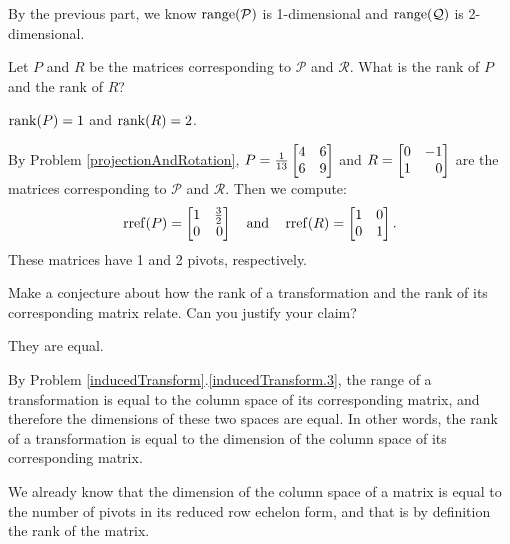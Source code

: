 \documentclass{workbook}
\begin{document}
\begin{slide}
\begin{parts}
\begin{solution}
				By the previous part, we know $\operatorname{range}(\mathcal P)$ is 1-dimensional
				and $\operatorname{range}(\mathcal Q)$ is 2-dimensional.
			\end{solution}
		\item Let $P$ and $R$ be the matrices corresponding to $\mathcal P$ and
			$\mathcal R$. What is the rank of $P$ and the rank of $R$?
			\begin{solution}
				$\operatorname{rank}(P)=1$ and $\operatorname{rank}(R)=2$.

				By Problem \ref{projectionAndRotation}, $P=\frac{1}{13}\mat{4&6\\6&9}$
				and $R=\mat{0&-1\\1&0}$ are the	matrices corresponding to
				$\mathcal P$ and $\mathcal R$. Then we compute:
				\[
					\rref(P)=\mat{1&\frac{3}{2}\\0&0}
					\quad \text{and} \quad
					\rref(R)=\mat{1&0\\0&1}.
				\]
				These matrices have 1 and 2 pivots, respectively.
			\end{solution}
		\item Make a conjecture about how the rank of a transformation and the
			rank of its corresponding matrix relate. Can you justify your claim?
			\label{rankOfMatricesAndTransformations.4}
			\begin{solution}
				They are equal.

				By Problem \ref{inducedTransform}.\ref{inducedTransform.3}, the
				range of a transformation is equal to the column space of its
				corresponding matrix, and therefore the dimensions of these two
				spaces are equal. In other words, the rank of a transformation is
				equal to the dimension of the column space of its corresponding
				matrix.

				We already know that the dimension of the column space of a matrix
				is equal to the number of pivots in its reduced row echelon form,
				and that is by definition the rank of the matrix.
			\end{solution}
	\end{parts}

\end{slide}
\end{document}
